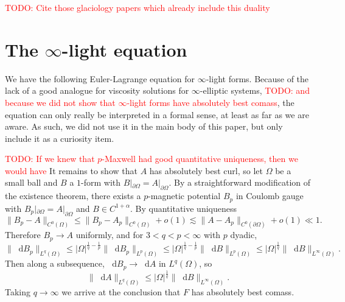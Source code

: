 \documentclass[reqno,11pt]{amsart}
\newcommand*\dif{\mathop{}\!\mathrm{d}}
\theoremstyle{definition}
\numberwithin{equation}{section}
\newcommand\todo[1]{\textcolor{red}{TODO: #1}}
\begin{document}
\todo{Cite those glaciology papers which already include this duality}

\section{The \texorpdfstring{$\infty$-light equation}{infinity-light equation}}
We have the following Euler-Lagrange equation for $\infty$-light forms.
Because of the lack of a good analogue for viscosity solutions for $\infty$-elliptic systems, \todo{and because we did not show that $\infty$-light forms have absolutely best comass}, the equation can only really be interpreted in a formal sense, at least as far as we are aware.
As such, we did not use it in the main body of this paper, but only include it as a curiosity item.

\todo{If we knew that $p$-Maxwell had good quantitative uniqueness, then we would have}
It remains to show that $A$ has absolutely best curl, so let $\Omega$ be a small ball and $B$ a $1$-form with $B|_{\partial \Omega} = A|_{\partial \Omega}$.
By a straightforward modification of the existence theorem, there exists a $p$-magnetic potential $B_p$ in Coulomb gauge with $B_p|_{\partial \Omega} = A|_{\partial \Omega}$ and $B \in C^{1 + \alpha}$.
By quantitative uniqueness
$$\|B_p - A\|_{C^0(\Omega)} \leq \|B_p - A_p\|_{C^0(\Omega)} + o(1) \lesssim \|A - A_p\|_{C^0(\partial \Omega)} + o(1) \ll 1.$$
Therefore $B_p \to A$ uniformly, and for $3 < q < p < \infty$ with $p$ dyadic,
$$\|\dif B_p\|_{L^q(\Omega)} \leq |\Omega|^{\frac{1}{q} -\frac{1}{p}} \|\dif B_p\|_{L^p(\Omega)} \leq |\Omega|^{\frac{1}{q} -\frac{1}{p}} \|\dif B\|_{L^p(\Omega)} \leq |\Omega|^{\frac{1}{q}} \|\dif B\|_{L^\infty(\Omega)}.$$
Then along a subsequence, $\dif B_p \to \dif A$ in $L^q(\Omega)$, so 
$$\|\dif A\|_{L^q(\Omega)} \leq |\Omega|^{\frac{1}{q}} \|\dif B\|_{L^\infty(\Omega)}.$$
Taking $q \to \infty$ we arrive at the conclusion that $F$ has absolutely best comass.
\end{document}
